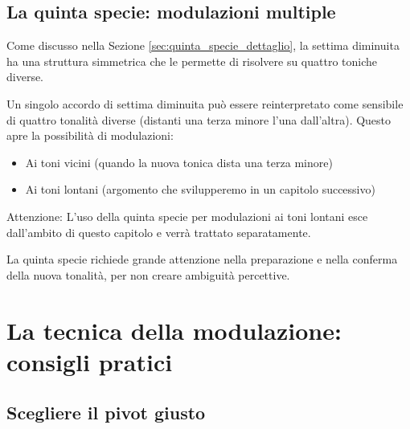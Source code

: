 \begin{esempio}[Modulazione Do M $\rightarrow$ Fa M tramite \sigla{II}{7}{} = \sigla{VI}{7}{}]
	\label{ex:mod_terza_specie}
	
\end{esempio}

\subsection{La quinta specie: modulazioni multiple}
\label{subsec:quinta_specie_modulazione}

Come discusso nella Sezione \ref{sec:quinta_specie_dettaglio}, la settima diminuita ha una struttura simmetrica che le permette di risolvere su quattro toniche diverse.

\begin{regola}
	\label{reg:quinta_specie_modulazioni}
	Un singolo accordo di settima diminuita può essere reinterpretato come sensibile di quattro tonalità diverse (distanti una terza minore l'una dall'altra). Questo apre la possibilità di modulazioni:
	
	\begin{itemize}
		\item Ai toni vicini (quando la nuova tonica dista una terza minore)
		\item Ai toni lontani (argomento che svilupperemo in un capitolo successivo)
	\end{itemize}
	
	Attenzione: L'uso della quinta specie per modulazioni ai toni lontani esce dall'ambito di questo capitolo e verrà trattato separatamente.
\end{regola}

La quinta specie richiede grande attenzione nella preparazione e nella conferma della nuova tonalità, per non creare ambiguità percettive.

\section{La tecnica della modulazione: consigli pratici}
\label{sec:tecnica_modulazione}

\subsection{Scegliere il pivot giusto}
\label{subsec:scelta_pivot}

